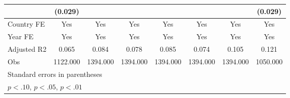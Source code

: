 \begin{table}[htbp]
{\begin{tabular}{l*{7}{c}}
                &  (0.029)         &                  &                  &                  &                  &                  &  (0.029)         \\
\hline
Country FE      &\multicolumn{1}{c}{Yes}         &\multicolumn{1}{c}{Yes}         &\multicolumn{1}{c}{Yes}         &\multicolumn{1}{c}{Yes}         &\multicolumn{1}{c}{Yes}         &\multicolumn{1}{c}{Yes}         &\multicolumn{1}{c}{Yes}         \\
Year FE         &\multicolumn{1}{c}{Yes}         &\multicolumn{1}{c}{Yes}         &\multicolumn{1}{c}{Yes}         &\multicolumn{1}{c}{Yes}         &\multicolumn{1}{c}{Yes}         &\multicolumn{1}{c}{Yes}         &\multicolumn{1}{c}{Yes}         \\
Adjusted R2     &\multicolumn{1}{c}{0.065}         &\multicolumn{1}{c}{0.084}         &\multicolumn{1}{c}{0.078}         &\multicolumn{1}{c}{0.085}         &\multicolumn{1}{c}{0.074}         &\multicolumn{1}{c}{0.105}         &\multicolumn{1}{c}{0.121}         \\
Obs             &\multicolumn{1}{c}{1122.000}         &\multicolumn{1}{c}{1394.000}         &\multicolumn{1}{c}{1394.000}         &\multicolumn{1}{c}{1394.000}         &\multicolumn{1}{c}{1394.000}         &\multicolumn{1}{c}{1394.000}         &\multicolumn{1}{c}{1050.000}         \\
\hline\hline
\multicolumn{8}{l}{\footnotesize Standard errors in parentheses}\\
\multicolumn{8}{l}{\footnotesize \sym{*} \(p<.10\), \sym{**} \(p<.05\), \sym{***} \(p<.01\)}\\
\end{tabular}}
\end{table}
